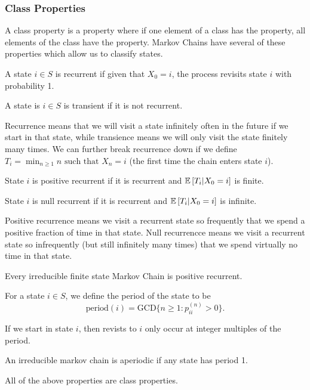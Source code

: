\subsubsection{Class Properties}
A class property is a property where if one element of a class has the property, all elements of the class have the property.
Markov Chains have several of these properties which allow us to classify states.
\begin{definition}
	A state $i\in S$ is recurrent if given that $X_0=i$, the process revisits state $i$ with probability 1.
	\label{defn:markov-recurrence}
\end{definition}
\begin{definition}
	A state is $i\in S$ is transient if it is not recurrent.
	\label{defn:markov-transience}
\end{definition}
Recurrence means that we will visit a state infinitely often in the future if we start in that state, while transience means we will only visit the state finitely many times.
We can further break recurrence down if we define $T_i = \min_{n\geq 1} n \text{ such that } X_n = i$ (the first time the chain enters state $i$).
\begin{definition}
	State $i$ is positive recurrent if it is recurrent and $\mathbb{E}\left[T_i|X_0=i\right]$ is finite.
	\label{defn:positive-recurrence}
\end{definition}
\begin{definition}
	State $i$ is null recurrent if it is recurrent and $\mathbb{E}\left[T_i|X_0=i\right]$ is infinite.
	\label{defn:null-recurrence}
\end{definition}
Positive recurrence means we visit a recurrent state so frequently that we spend a positive fraction of time in that state.
Null recurrencce means we visit a recurrent state so infrequently (but still infinitely many times) that we spend virtually no time in that state.
\begin{theorem}
	Every irreducible finite state Markov Chain is positive recurrent.
	\label{thm:positive-recurrence}
\end{theorem}
\begin{definition}
	For a state $i\in S$, we define the period of the state to be
	\[
		\text{period}(i) = \text{GCD}\{n\geq 1 : p_{ii}^{(n)} > 0 \}.
	\]
	\label{defn:period}
\end{definition}
If we start in state $i$, then revists to $i$ only occur at integer multiples of the period.
\begin{definition}
	An irreducible markov chain is aperiodic if any state has period 1.
	\label{defn:aperiodic-mc}
\end{definition}
All of the above properties are class properties.
